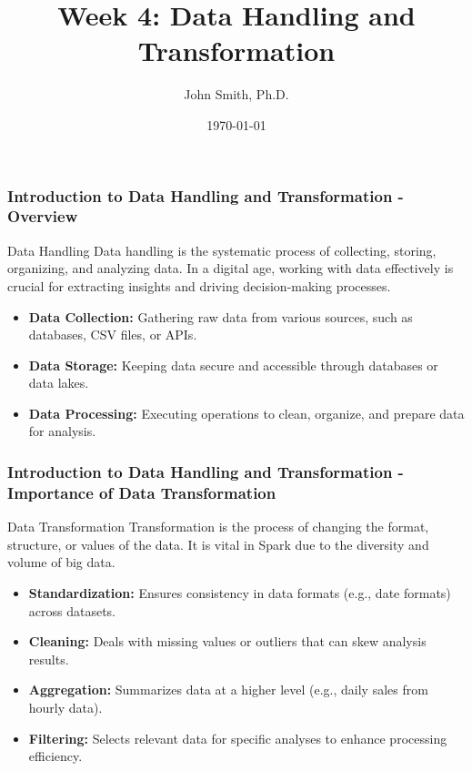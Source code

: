 \documentclass[aspectratio=169]{beamer}
\title[Week 4: Data Handling and Transformation]{Week 4: Data Handling and Transformation}
\author[J. Smith]{John Smith, Ph.D.}
\institute[University Name]{
  Department of Computer Science\\
  University Name\\
  Email: email@university.edu\\
  Website: www.university.edu
}
\date{\today}
\begin{document}
\frame{\titlepage}

\begin{frame}[fragile]
    \frametitle{Introduction to Data Handling and Transformation - Overview}
    \begin{block}{Data Handling}
        Data handling is the systematic process of collecting, storing, organizing, and analyzing data. 
        In a digital age, working with data effectively is crucial for extracting insights and driving decision-making processes.
    \end{block}
    
    \begin{itemize}
        \item \textbf{Data Collection:} Gathering raw data from various sources, such as databases, CSV files, or APIs.
        \item \textbf{Data Storage:} Keeping data secure and accessible through databases or data lakes.
        \item \textbf{Data Processing:} Executing operations to clean, organize, and prepare data for analysis.
    \end{itemize}
\end{frame}

\begin{frame}[fragile]
    \frametitle{Introduction to Data Handling and Transformation - Importance of Data Transformation}
    \begin{block}{Data Transformation}
        Transformation is the process of changing the format, structure, or values of the data. It is vital in Spark due to the diversity and volume of big data.
    \end{block}

    \begin{itemize}
        \item \textbf{Standardization:} Ensures consistency in data formats (e.g., date formats) across datasets.
        \item \textbf{Cleaning:} Deals with missing values or outliers that can skew analysis results.
        \item \textbf{Aggregation:} Summarizes data at a higher level (e.g., daily sales from hourly data).
        \item \textbf{Filtering:} Selects relevant data for specific analyses to enhance processing efficiency.
    \end{itemize}
\end{frame}
\end{document}
